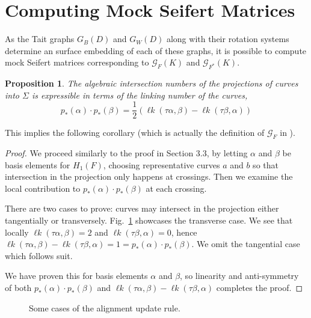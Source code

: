 \documentclass[12pt]{report}
\newcommand{\lk}{\operatorname{\ell\textit{k}}}
\newtheorem*{proposition}{Proposition}
\theoremstyle{upright}
\begin{document}
\section{Computing Mock Seifert Matrices}

As the Tait graphs $G_{B}(D)$ and $G_{W}(D)$ along with their rotation systems determine an surface embedding of each of these graphs, it is possible to compute mock Seifert matrices corresponding to $\mathcal{G}_{F}(K)$ and $\mathcal{G}_{F^{*}}(K)$.

\begin{proposition}
	The algebraic intersection numbers of the projections of curves into $\Sigma$ is expressible in terms of the linking number of the curves,
	\[p_{*}(\alpha) \cdot p_{*}(\beta) = \dfrac{1}{2}\left(\lk(\tau \alpha, \beta) - \lk(\tau \beta, \alpha)\right)\]
\end{proposition}

This implies the following corollary (which is actually the definition of $\mathcal{G}_{F}$ in \cite{gordon-litherland-pairing-thickened-surfaces}).

\begin{proof}
	We proceed similarly to the proof in Section 3.3, by letting $\alpha$ and $\beta$ be basis elements for $H_{1}(F)$, choosing representative curves $a$ and $b$ so that intersection in the projection only happens at crossings. Then we examine the local contribution to $p_{*}(\alpha) \cdot p_{*}(\beta)$ at each crossing.
	
	There are two cases to prove: curves may intersect in the projection either tangentially or transversely. Fig.~\ref{fig:intersection-number-example} showcases the transverse case. We see that locally $\lk(\tau\alpha, \beta) = 2$ and $\lk(\tau\beta, \alpha) = 0$, hence $\lk(\tau\alpha, \beta) - \lk(\tau\beta, \alpha) = 1 = p_{*}(\alpha) \cdot p_{*}(\beta)$. We omit the tangential case which follows suit.
	
	We have proven this for basis elements $\alpha$ and $\beta$, so linearity and anti-symmetry of both $p_{*}(\alpha) \cdot p_{*}(\beta)$ and $\lk(\tau\alpha, \beta) - \lk(\tau\beta, \alpha)$ completes the proof.
\end{proof}

	\begin{figure}[hbt!]
		\centering
		\def\svgscale{0.54}
		
		
		\caption{Some cases of the alignment update rule.}
		\label{fig:intersection-number-example}
	\end{figure}
\end{document}
